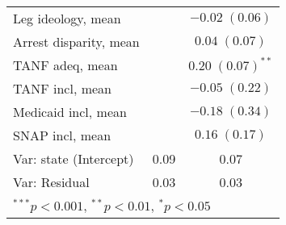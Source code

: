 \begin{table}
\begin{center}
\begin{tabular}{l c c }
Leg ideology, mean         &                         & $-0.02 \; (0.06)$       \\
Arrest disparity, mean     &                         & $0.04 \; (0.07)$        \\
TANF adeq, mean            &                         & $0.20 \; (0.07)^{**}$   \\
TANF incl, mean            &                         & $-0.05 \; (0.22)$       \\
Medicaid incl, mean        &                         & $-0.18 \; (0.34)$       \\
SNAP incl, mean            &                         & $0.16 \; (0.17)$        \\
\hline
Var: state (Intercept)     & 0.09                    & 0.07                    \\
Var: Residual              & 0.03                    & 0.03                    \\
\hline
\multicolumn{3}{l}{\scriptsize{$^{***}p<0.001$, $^{**}p<0.01$, $^*p<0.05$}}
\end{tabular}
\label{table:coefficients}
\end{center}
\end{table}
